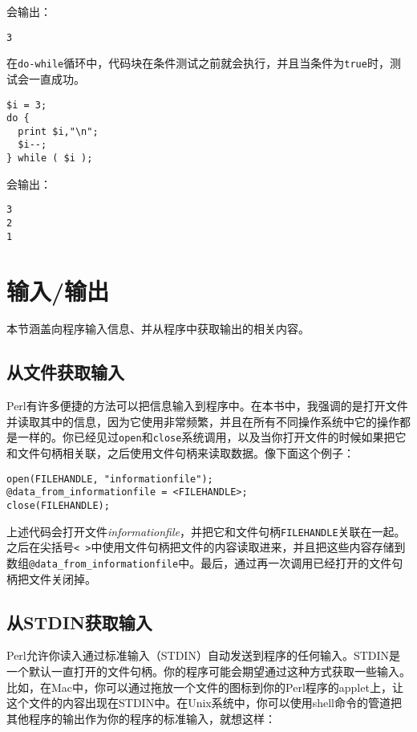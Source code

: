 会输出：

\begin{lstlisting}
3
\end{lstlisting}

在\verb|do-while|循环中，代码块在条件测试之前就会执行，并且当条件为\verb|true|时，测试会一直成功。

\begin{lstlisting}
$i = 3;
do {
  print $i,"\n";
  $i--;
} while ( $i );
\end{lstlisting}

会输出：

\begin{lstlisting}
3
2
1
\end{lstlisting}

\section{输入/输出}
本节涵盖向程序输入信息、并从程序中获取输出的相关内容。

\subsection{从文件获取输入}
Perl有许多便捷的方法可以把信息输入到程序中。在本书中，我强调的是打开文件并读取其中的信息，因为它使用非常频繁，并且在所有不同操作系统中它的操作都是一样的。你已经见过\verb|open|和\verb|close|系统调用，以及当你打开文件的时候如果把它和文件句柄相关联，之后使用文件句柄来读取数据。像下面这个例子：

\begin{lstlisting}
open(FILEHANDLE, "informationfile");
@data_from_informationfile = <FILEHANDLE>;
close(FILEHANDLE);
\end{lstlisting}

上述代码会打开文件\textit{informationfile}，并把它和文件句柄\verb|FILEHANDLE|关联在一起。之后在尖括号\verb|< >|中使用文件句柄把文件的内容读取进来，并且把这些内容存储到数组\verb|@data_from_informationfile|中。最后，通过再一次调用已经打开的文件句柄把文件关闭掉。

\subsection{从STDIN获取输入}
Perl允许你读入通过标准输入（STDIN）自动发送到程序的任何输入。STDIN是一个默认一直打开的文件句柄。你的程序可能会期望通过这种方式获取一些输入。比如，在Mac中，你可以通过拖放一个文件的图标到你的Perl程序的applet上，让这个文件的内容出现在STDIN中。在Unix系统中，你可以使用shell命令的管道把其他程序的输出作为你的程序的标准输入，就想这样：

